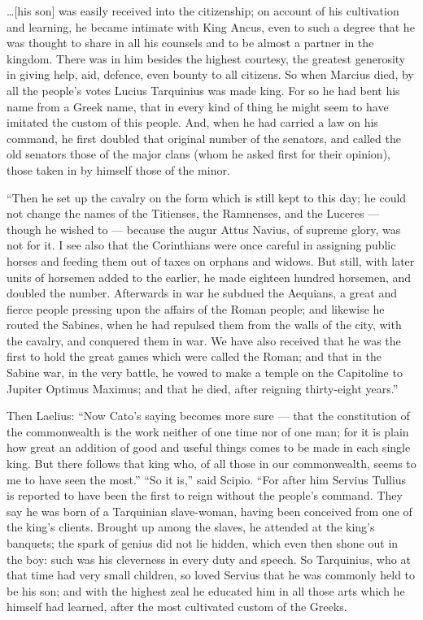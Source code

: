  \ldots [his son] was easily received into the citizenship; on account of his cultivation and learning, he became intimate with King Ancus, even to such a degree that he was thought to share in all his counsels and to be almost a partner in the kingdom. There was in him besides the highest courtesy, the greatest generosity in giving help, aid, defence, even bounty to all citizens. So when Marcius died, by all the people's votes Lucius Tarquinius was made king. For so he had bent his name from a Greek name, that in every kind of thing he might seem to have imitated the custom of this people. And, when he had carried a law on his command, he first doubled that original number of the senators, and called the old senators those of the major clans (whom he asked first for their opinion), those taken in by himself those of the minor.

 ``Then he set up the cavalry on the form which is still kept to this day; he could not change the names of the Titienses, the Ramnenses, and the Luceres --- though he wished to --- because the augur Attus Navius, of supreme glory, was not for it. I see also that the Corinthians were once careful in assigning public horses and feeding them out of taxes on orphans and widows. But still, with later units of horsemen added to the earlier, he made eighteen hundred horsemen, and doubled the number. Afterwards in war he subdued the Aequians, a great and fierce people pressing upon the affairs of the Roman people; and likewise he routed the Sabines, when he had repulsed them from the walls of the city, with the cavalry, and conquered them in war. We have also received that he was the first to hold the great games which were called the Roman; and that in the Sabine war, in the very battle, he vowed to make a temple on the Capitoline to Jupiter Optimus Maximus; and that he died, after reigning thirty-eight years.''

 Then Laelius: ``Now Cato's saying becomes more sure --- that the constitution of the commonwealth is the work neither of one time nor of one man; for it is plain how great an addition of good and useful things comes to be made in each single king. But there follows that king who, of all those in our commonwealth, seems to me to have seen the most.'' ``So it is,'' said Scipio. ``For after him Servius Tullius is reported to have been the first to reign without the people's command. They say he was born of a Tarquinian slave-woman, having been conceived from one of the king's clients. Brought up among the slaves, he attended at the king's banquets; the spark of genius did not lie hidden, which even then shone out in the boy: such was his cleverness in every duty and speech. So Tarquinius, who at that time had very small children, so loved Servius that he was commonly held to be his son; and with the highest zeal he educated him in all those arts which he himself had learned, after the most cultivated custom of the Greeks.

